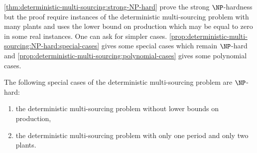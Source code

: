 


\cref{thm:deterministic-multi-sourcing:strong-NP-hard} prove the strong $\NP$-hardness but the proof require instances of the deterministic multi-sourcing problem with many plants and uses the lower bound on production which may be equal to zero in some real instances.
One can ask for simpler cases.
\cref{prop:deterministic-multi-sourcing:NP-hard:special-cases} gives some special cases which remain $\NP$-hard and \cref{prop:deterministic-multi-sourcing:polynomial-cases} gives some polynomial cases.


\begin{prop}\label{prop:deterministic-multi-sourcing:NP-hard:special-cases}
  The following special cases of the deterministic multi-sourcing problem are $\NP$-hard:
  \begin{enumerate}
    \item\label{item:deterministic-multi-sourcing:NP-hard:without-production-lower-bound}
    the deterministic multi-sourcing problem without lower bounds on production,
    \item\label{item:deterministic-multi-sourcing:NP-hard:2-plants}
    the deterministic multi-sourcing problem with only one period and only two plants.
  \end{enumerate}
\end{prop}


